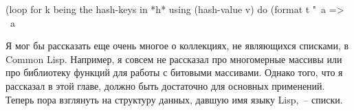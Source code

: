 \begin{myverb}  
(loop for k being the hash-keys in *h* using (hash-value v)
   do (format t "~a => ~a~%
\end{myverb}

Я мог бы рассказать еще очень многое о коллекциях, не являющихся списками, в Common
Lisp.  Например, я совсем не рассказал про многомерные массивы или про библиотеку функций
для работы с битовыми массивами.  Однако того, что я рассказал в этой главе, должно быть
достаточно для основных применений.  Теперь пора взглянуть на
структуру данных, давшую имя языку Lisp,~-- списки.

